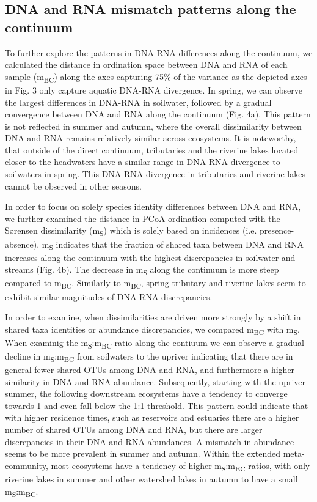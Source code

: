 \documentclass[12pt,a4paper]{article} %
\begin{document}
\subsection*{DNA and RNA mismatch patterns along the continuum}
To further explore the patterns in DNA-RNA differences along the continuum, we calculated the distance in ordination space between DNA and RNA of each sample (m\textsubscript{BC}) along the axes capturing 75\% of the variance as the depicted axes in Fig. 3 only capture aquatic DNA-RNA divergence. In spring, we can observe the largest differences in DNA-RNA in soilwater, followed by a gradual convergence between DNA and RNA along the continuum (Fig. 4a). This pattern is not reflected in summer and autumn, where the overall dissimilarity between DNA and RNA remains relatively similar across ecosystems. It is noteworthy, that outside of the direct continuum, tributaries and the riverine lakes located closer to the headwaters have a similar range in DNA-RNA divergence to soilwaters in spring. This DNA-RNA divergence in tributaries and riverine lakes cannot be observed in other seasons.

In order to focus on solely species identity differences between DNA and RNA, we further examined the distance in PCoA ordination computed with the S{\o}rensen dissimilarity (m\textsubscript{S}) which is solely based on incidences (i.e. presence-absence). m\textsubscript{S} indicates that the fraction of shared taxa between DNA and RNA increases along the continuum with the highest discrepancies in soilwater and streams (Fig. 4b). The decrease in m\textsubscript{S} along the continuum is more steep compared to m\textsubscript{BC}. Similarly to m\textsubscript{BC}, spring tributary and riverine lakes seem to exhibit similar magnitudes of DNA-RNA discrepancies.

In order to examine, when dissimilarities are driven more strongly by a shift in shared taxa identities or abundance discrepancies, we compared m\textsubscript{BC} with m\textsubscript{S}. When examinig the m\textsubscript{S}:m\textsubscript{BC} ratio along the contiuum we can observe a gradual decline in m\textsubscript{S}:m\textsubscript{BC} from soilwaters to the upriver indicating that there are in general fewer shared OTUs among DNA and RNA, and furthermore a higher similarity in DNA and RNA abundance. Subsequently, starting with the upriver summer, the following downstream ecosystems have a tendency to converge towards 1 and even fall below the 1:1 threshold. This pattern could indicate that with higher residence times, such as reservoirs and estuaries there are a higher number of shared OTUs among DNA and RNA, but there are larger discrepancies in their DNA and RNA abundances. A mismatch in abundance seems to be more prevalent in summer and autumn. Within the extended meta-community, most ecosystems have a tendency of higher m\textsubscript{S}:m\textsubscript{BC} ratios, with only riverine lakes in summer and other watershed lakes in autumn to have a small m\textsubscript{S}:m\textsubscript{BC}.
\end{document}
